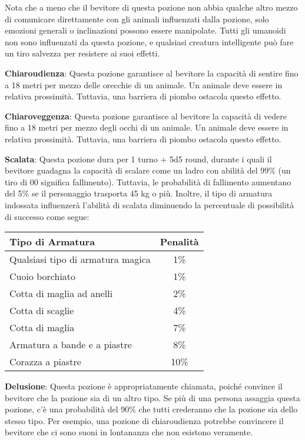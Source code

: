\documentclass{article}
\begin{document}
\begin{multicols}{2}
\begin{table}[h]
\end{table}

Nota che a meno che il bevitore di questa pozione non abbia qualche altro mezzo di comunicare direttamente con gli animali influenzati dalla pozione, solo emozioni generali o inclinazioni possono essere manipolate. Tutti gli umanoidi non sono influenzati da questa pozione, e qualsiasi creatura intelligente può fare un tiro salvezza per resistere ai suoi effetti.

\textbf{Chiaroudienza}: Questa pozione garantisce al bevitore la capacità di sentire fino a 18 metri per mezzo delle orecchie di un animale. Un animale deve essere in relativa prossimità. Tuttavia, una barriera di piombo ostacola questo effetto.

\textbf{Chiaroveggenza}: Questa pozione garantisce al bevitore la capacità di vedere fino a 18 metri per mezzo degli occhi di un animale. Un animale deve essere in relativa prossimità. Tuttavia, una barriera di piombo ostacola questo effetto.

\textbf{Scalata}: Questa pozione dura per 1 turno + 5d5 round, durante i quali il bevitore guadagna la capacità di scalare come un ladro con abilità del 99\% (un tiro di 00 significa fallimento). Tuttavia, le probabilità di fallimento aumentano del 5\% se il personaggio trasporta 45 kg o più. Inoltre, il tipo di armatura indossata influenzerà l'abilità di scalata diminuendo la percentuale di possibilità di successo come segue:

\begin{table}[h]
\centering
\begin{tabular}{|l|c|}
\hline
\textbf{Tipo di Armatura} & \textbf{Penalità} \\
\hline
Qualsiasi tipo di armatura magica & 1\% \\
Cuoio borchiato & 1\% \\
Cotta di maglia ad anelli & 2\% \\
Cotta di scaglie & 4\% \\
Cotta di maglia & 7\% \\
Armatura a bande e a piastre & 8\% \\
Corazza a piastre & 10\% \\
\hline
\end{tabular}

\end{table}

\textbf{Delusione}: Questa pozione è appropriatamente chiamata, poiché convince il bevitore che la pozione sia di un altro tipo. Se più di una persona assaggia questa pozione, c'è una probabilità del 90\% che tutti crederanno che la pozione sia dello stesso tipo. Per esempio, una pozione di chiaroudienza potrebbe convincere il bevitore che ci sono suoni in lontananza che non esistono veramente.


\end{multicols}
\end{document}
